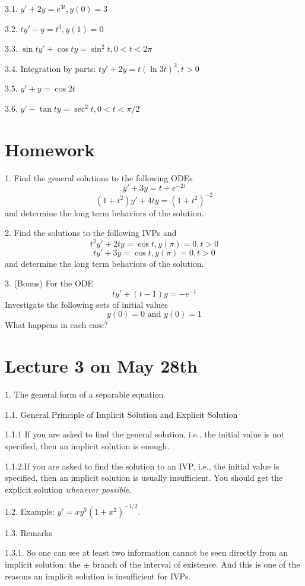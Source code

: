 \documentclass[11pt]{article}
\begin{document}
3.1. $y' + 2y = e^{3t}, y(0) = 3$

3.2. $ty' -  y = t^3, y(1) = 0$

3.3. $\sin t y' + \cos t y = \sin^2 t, 0<t<2\pi$

3.4. Integration by parts: $t y' + 2 y = t (\ln 3t)^2, t>0$

3.5. $y' + y = \cos 2t$

3.6. $y' - \tan t y = \sec^2 t, 0<t<\pi/2$


\newpage

\section*{Homework}

1. Find the general solutions to the following ODEs
$$y' + 3y = t + e^{-2t}$$
$$(1+t^2) y' + 4t y = (1+t^2)^{-2}$$
and determine the long term behaviors of the solution. 

2. Find the solutions to the following IVPs and
$$t^2 y' + 2ty = \cos t, y(\pi)= 0, t>0$$
$$ty'+3y = \cos t, y(\pi) = 0, t>0 $$
and determine the long term behaviors of the solution.

3. (Bonus) For the ODE
$$ty'+ (t-1)y = -e^{-t}$$
Investigate the following sets of initial values
$$y(0) = 0 \text{ and } y(0) = 1$$
What happens in each case? 


\newpage


\section{Lecture 3 on May 28th}

1. The general form of a separable equation.

1.1. General Principle of Implicit Solution and Explicit Solution

1.1.1 If you are asked to find the general solution, i.e., the initial value is not specified, then an implicit solution is enough.

1.1.2.If you are asked to find the solution to an IVP, i.e., the initial value is specified, then an implicit solution is usually insufficient. You should get the explicit solution \textit{whenever possible}.

1.2. Example: $y' = xy^3 (1+x^2)^{-1/2}$.

1.3. Remarks

1.3.1. So one can see at least two information cannot be seen directly from an implicit solution: the $\pm$ branch of the interval of existence. And this is one of the reasons an  implicit solution is insufficient for IVPs. 
\end{document}
